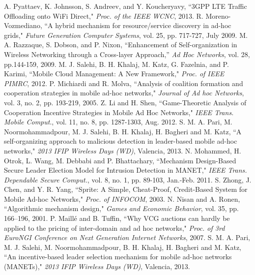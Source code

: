 \documentclass[journal,12pt, onecolumn]{IEEEtran}
\begin{document}
\begin{thebibliography}{31}
A. Pyattaev, K. Johnsson, S. Andreev, and Y. Koucheryavy, ``3GPP LTE Traffic Offloading onto WiFi Direct," \textit{Proc. of the IEEE WCNC}, 2013.
R. Moreno-Vozmediano, ``A hybrid mechanism for resource/service discovery in ad-hoc grids," \textit{Future Generation Computer Systems}, vol. 25, pp. 717-727, July 2009. 
M. A. Razzaque, S. Dobson, and P. Nixon, ``Enhancement of Self-organization in Wireless Networking through a Cross-layer Approach,'' \textit{Ad Hoc Networks}, vol. 28, pp.144-159, 2009. 
M. J. Salehi, B. H. Khalaj, M. Katz, G. Fazelnia, and P. Karimi, ``Mobile Cloud Management: A New Framework," \textit{Proc. of IEEE PIMRC}, 2012.
P. Michiardi and R. Molva, ``Analysis of coalition formation and cooperation strategies in mobile ad-hoc networks," \textit{Journal of Ad hoc Networks}, vol. 3, no. 2, pp. 193-219, 2005.
Z. Li and H. Shen, ``Game-Theoretic Analysis of Cooperation Incentive Strategies in Mobile Ad Hoc Networks," \textit{IEEE Trans. Mobile Comput}., vol. 11, no. 8, pp. 1287-1303, Aug. 2012.
S. M. A. Pari, M. Noormohammadpour, M. J. Salehi, B. H. Khalaj, H. Bagheri and M. Katz, ``A self-organizing approach to malicious detection in leader-based mobile ad-hoc networks," \textit{2013 IFIP Wireless Days (WD)}, Valencia, 2013.
N. Mohammed, H. Otrok, L. Wang, M. Debbabi and P. Bhattachary, ``Mechanism Design-Based Secure Leader Election Model for Intrusion Detection in MANET," \textit{IEEE Trans. Dependable Secure Comput.}, vol. 8, no. 1, pp. 89-103, Jan.-Feb. 2011. 
S. Zhong, J. Chen, and Y. R. Yang, ``Sprite: A Simple, Cheat-Proof, Credit-Based System for Mobile Ad-hoc Networks," \textit{Proc. of INFOCOM}, 2003.
N. Nisan and A. Ronen, ``Algorithmic mechanism design," \textit{Games and Economic Behavior}, vol. 35, pp. 166–196, 2001.
P. Maillé and B. Tuffin, ``Why VCG auctions can hardly be applied to the pricing of inter-domain and ad hoc networks," \textit{Proc. of 3rd EuroNGI Conference on Next Generation Internet Networks}, 2007.
S. M. A. Pari, M. J. Salehi, M. Noormohammadpour, B. H. Khalaj, H. Bagheri and M. Katz, ``An incentive-based leader selection mechanism for mobile ad-hoc networks (MANETs)," \textit{2013 IFIP Wireless Days (WD)}, Valencia, 2013.


\end{thebibliography}
\end{document}
